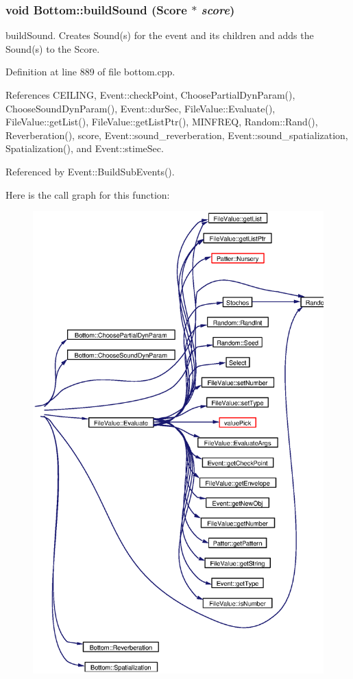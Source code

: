 \subsubsection{\setlength{\rightskip}{0pt plus 5cm}void Bottom::build\-Sound (Score $\ast$ {\em score})}\label{classBottom_a13}


build\-Sound. Creates Sound(s) for the event and its children and adds the Sound(s) to the Score. 

Definition at line 889 of file bottom.cpp.

References CEILING, Event::check\-Point, Choose\-Partial\-Dyn\-Param(), Choose\-Sound\-Dyn\-Param(), Event::dur\-Sec, File\-Value::Evaluate(), File\-Value::get\-List(), File\-Value::get\-List\-Ptr(), MINFREQ, Random::Rand(), Reverberation(), score, Event::sound\_\-reverberation, Event::sound\_\-spatialization, Spatialization(), and Event::stime\-Sec.

Referenced by Event::Build\-Sub\-Events().

Here is the call graph for this function:\begin{figure}[H]
\begin{center}
\leavevmode
\includegraphics[width=325pt]{classBottom_a13_cgraph}
\end{center}
\end{figure}
